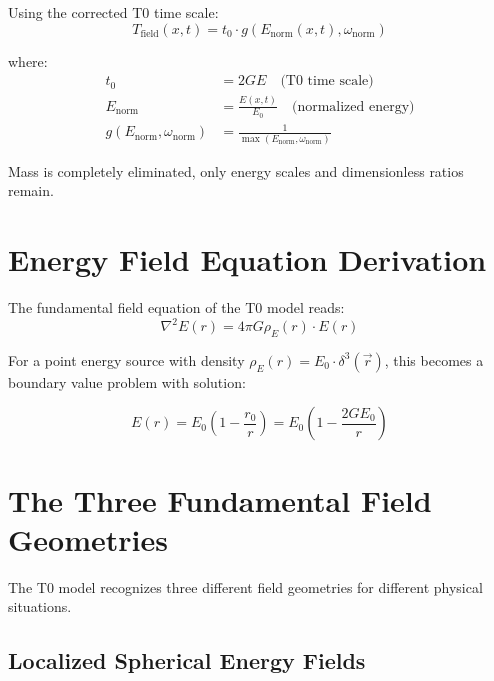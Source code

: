 \documentclass[12pt,a4paper]{report}
\newcommand{\rzero}{r_0}                  %
\newcommand{\tzero}{t_0}                  %
\begin{document}
	Using the corrected T0 time scale:
	\begin{equation}
		\boxed{T_{\text{field}}(x,t) = \tzero \cdot g(E_{\text{norm}}(x,t), \omega_{\text{norm}})}
		\label{eq:time_field_energy_based}
	\end{equation}
	
	where:
	\begin{align}
		\tzero &= 2GE \quad \text{(T0 time scale)} \\
		E_{\text{norm}} &= \frac{E(x,t)}{E_0} \quad \text{(normalized energy)} \\
		g(E_{\text{norm}}, \omega_{\text{norm}}) &= \frac{1}{\max(E_{\text{norm}}, \omega_{\text{norm}})}
	\end{align}
	
	Mass is completely eliminated, only energy scales and dimensionless ratios remain.
	
	\section{Energy Field Equation Derivation}
	\label{sec:energy_field_equation}
	
	The fundamental field equation of the T0 model reads:
	\begin{equation}
		\nabla^2 E(r) = 4\pi G \rho_E(r) \cdot E(r)
		\label{eq:t0_field_equation_energy}
	\end{equation}
	
	For a point energy source with density $\rho_E(r) = E_0 \cdot \delta^3(\vec{r})$, this becomes a boundary value problem with solution:
	
	\begin{equation}
		\boxed{E(r) = E_0\left(1 - \frac{\rzero}{r}\right) = E_0\left(1 - \frac{2GE_0}{r}\right)}
		\label{eq:complete_energy_solution}
	\end{equation}
	
	\section{The Three Fundamental Field Geometries}
	\label{sec:three_field_geometries}
	
	The T0 model recognizes three different field geometries for different physical situations.
	
	\subsection{Localized Spherical Energy Fields}
	\label{subsec:localized_spherical}
	
\end{document}
